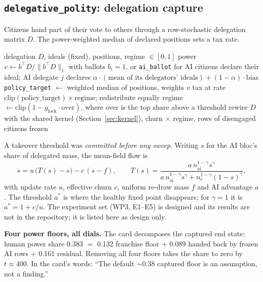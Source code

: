 \documentclass[11pt]{article}
\newcommand{\code}[1]{\texttt{#1}}
\begin{document}
\subsection{\code{delegative\_polity}: delegation capture}

Citizens hand part of their vote to others through a row-stochastic delegation matrix
$D$. The power-weighted median of declared positions sets a tax rate.

\begin{algorithm}[H]
\caption{One tick of \code{delegative\_polity}}
\begin{algorithmic}[1]
\Require delegation $D$, ideals (fixed), positions, regime $\in[0,1]$
\State power $v \gets b^\top D / \lVert b^\top D \rVert_1$ with ballots $b_i = 1$, or \code{ai\_ballot} for AI
\State citizens declare their ideal; AI delegate $j$ declares
  $\alpha\cdot(\text{mean of its delegators' ideals}) + (1-\alpha)\cdot\text{bias}$
\State \code{policy\_target} $\gets$ weighted median of positions, weights $v$
\State tax at rate $\mathrm{clip}(\text{policy\_target})\times\text{regime}$; redistribute equally
\State regime $\gets \mathrm{clip}(1 - g_{\text{lock}}\cdot\text{over})$, where over is the top share above a threshold
\State rewire $D$ with the shared kernel (Section~\ref{sec:kernel}), churn $\times$ regime, rows of disengaged citizens frozen
\end{algorithmic}
\end{algorithm}

\noindent A takeover threshold was \emph{committed before any sweep}. Writing $s$ for
the AI bloc's share of delegated mass, the mean-field flow is
\[
\dot s = u\,\big(T(s)-s\big) - c\,(s-f),\qquad
T(s) = \frac{a\, n_{\text{ai}}^{1-\gamma} s^{\gamma}}{a\, n_{\text{ai}}^{1-\gamma} s^{\gamma} + n_c^{1-\gamma}(1-s)^{\gamma}},
\]
with update rate $u$, effective churn $c$, uniform re-draw mass $f$ and AI advantage
$a$. The threshold $a^*$ is where the healthy fixed point disappears; for $\gamma=1$ it
is $a^* = 1 + c/u$. The experiment set (WP3, E1--E5) is designed and its results are not
in the repository; it is listed here as design only.

\textbf{Four power floors, all dials.} The card decomposes the captured end state:
human power share 0.383 $=$ 0.132 franchise floor $+$ 0.089 handed back by frozen AI
rows $+$ 0.161 residual. Removing all four floors takes the share to zero by $t\approx
400$. In the card's words: ``The default $\sim$0.38 captured floor is an assumption, not
a finding.''
\end{document}
